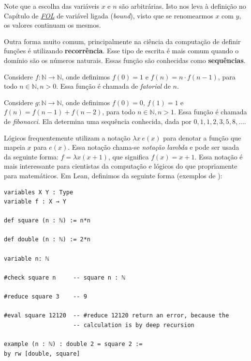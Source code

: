 Note que a escolha das variáveis $x$ e $n$ são arbitrárias. Isto nos leva à
definição no Capítulo de \textit{\hyperlink{chapter.4}{FOL}} de variável
ligada (\textit{bound}), visto que se renomearmos $x$ com $y$, os valores
continuam os mesmos.

 Outra forma muito comum, principalmente na ciência da computação de definir
 funções é utilizando \textbf{recorrência}. Esse tipo de escrita é mais comum
 quando o domínio são os números naturais. Essas função são conhecidas como
 \textbf{sequências}. 

\begin{example}
     Considere $f: \mathbb{N} \to \mathbb{N}$, onde definimos $f(0) = 1$ e
     $f(n) = n\cdot f(n-1)$, para todo $n \in \mathbb{N}, n > 0$. Essa função
     é chamada de \textit{fatorial} de $n$. 
\end{example}

\begin{example}
    Considere $g: \mathbb{N} \to \mathbb{N}$, onde definimos $f(0) = 0$, $f(1)
   = 1$ e $f(n) = f(n-1) + f(n-2)$, para todo $n \in \mathbb{N}, n > 1$. Essa função
   é chamada de \textit{fibonacci}. Ela determina uma sequência conhecida, dada
   por $0, 1, 1, 2, 3, 5 ,8, ...$.  
\end{example}

Lógicos frequentemente utilizam a notação $\lambda x ~e(x)$ para denotar a
função que mapeia $x$ para $e(x)$. Essa notação chama-se \textit{notação
lambda} e pode ser usada da seguinte forma: $f = \lambda x(x + 1)$, que
significa $f(x) = x + 1$. Essa notação é mais interessante para cientistas da
computação e lógicos do que propriamente para matemáticos. Em Lean, definimos
da seguinte forma (exemplos de \cite{kevinbook}): 

\begin{lstlisting}
variables X Y : Type
variable f : X → Y

def square (n : ℕ) := n*n 

def double (n : ℕ) := 2*n

variable n: ℕ 

#check square n     -- square n : ℕ 

#reduce square 3    -- 9

#eval square 12120  -- #reduce 12120 return an error, because the 
                    -- calculation is by deep recursion

example (n : ℕ) : double 2 = square 2 :=
by rw [double, square]
\end{lstlisting}

